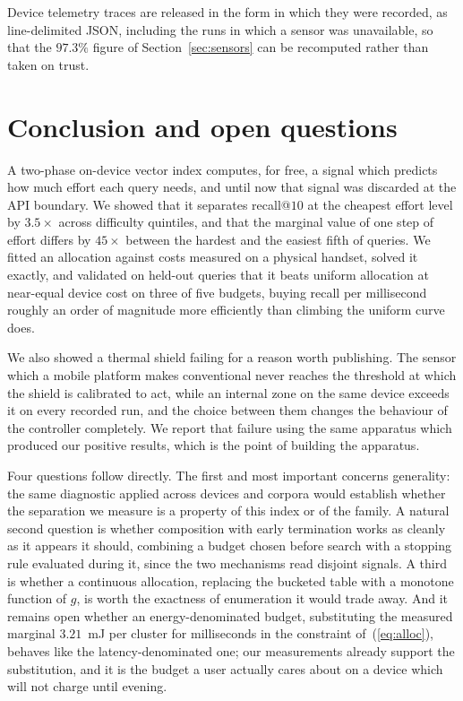 \documentclass[journal]{IEEEtran}
\begin{document}
Device telemetry traces are released in the form in which they were
recorded, as line-delimited JSON, including the runs in which a sensor was
unavailable, so that the $97.3\%$ figure of Section~\ref{sec:sensors} can
be recomputed rather than taken on trust.

\section{Conclusion and open questions}
\label{sec:conclusion}

A two-phase on-device vector index computes, for free, a signal which
predicts how much effort each query needs, and until now that signal was
discarded at the API boundary. We showed that it separates recall@$10$ at
the cheapest effort level by $3.5\times$ across difficulty quintiles, and
that the marginal value of one step of effort differs by $45\times$ between
the hardest and the easiest fifth of queries. We fitted an allocation
against costs measured on a physical handset, solved it exactly, and
validated on held-out queries that it beats uniform allocation at
near-equal device cost on three of five budgets, buying recall per
millisecond roughly an order of magnitude more efficiently than climbing
the uniform curve does.

We also showed a thermal shield failing for a reason worth publishing. The
sensor which a mobile platform makes conventional never reaches the
threshold at which the shield is calibrated to act, while an internal zone
on the same device exceeds it on every recorded run, and the choice between
them changes the behaviour of the controller completely. We report that
failure using the same apparatus which produced our positive results, which
is the point of building the apparatus.

Four questions follow directly. The first and most important concerns
generality: the same diagnostic applied across devices and corpora would
establish whether the separation we measure is a property of this index or
of the family. A natural second question is whether composition with early
termination works as cleanly as it appears it should, combining a budget
chosen before search with a stopping rule evaluated during it, since the
two mechanisms read disjoint signals. A third is whether a continuous
allocation, replacing the bucketed table with a monotone function of $g$,
is worth the exactness of enumeration it would trade away. And it remains
open whether an energy-denominated budget, substituting the measured
marginal $3.21$~mJ per cluster for milliseconds in the constraint
of~(\ref{eq:alloc}), behaves like the latency-denominated one; our
measurements already support the substitution, and it is the budget a user
actually cares about on a device which will not charge until evening.
\end{document}
